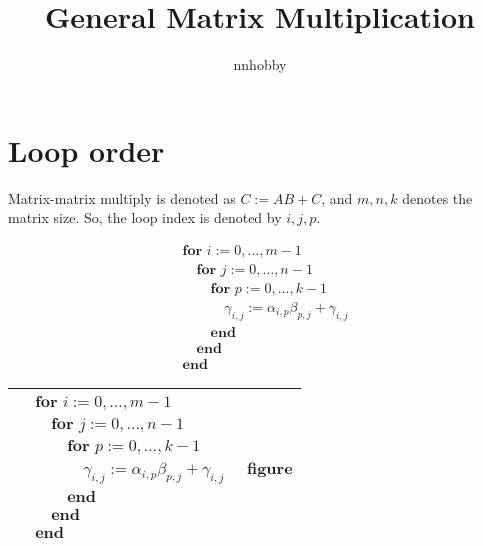 \documentclass[a4paper,12pt]{article}
\title{General Matrix Multiplication}
\author{nnhobby}
\date{}
\begin{document}
\maketitle

\section{Loop order}
Matrix-matrix multiply is denoted as $C := AB + C$, and $m, n, k$ denotes the matrix size.
So, the loop index is denoted by $i, j, p$.

\begin{align*}
&\textbf{for~} i := 0, \ldots , m-1 \\
&\hspace{1em} \textbf{for~} j := 0, \ldots , n-1 \\
&\hspace{2em} \textbf{for~} p := 0, \ldots , k-1 \\
&\hspace{3em} \gamma_{i,j} := \alpha_{i,p} \beta_{p,j} + \gamma_{i,j} \\
&\hspace{2em} \textbf{end} \\
&\hspace{1em} \textbf{end} \\
&\textbf{end}
\end{align*}


\begin{center}
\begin{tabular}{|l|c|}
\hline
{$\!\begin{aligned}
&\textbf{for~} i := 0, \ldots , m-1 \\
&\hspace{1em} \textbf{for~} j := 0, \ldots , n-1 \\
&\hspace{2em} \textbf{for~} p := 0, \ldots , k-1 \\
&\hspace{3em} \gamma_{i,j} := \alpha_{i,p} \beta_{p,j} + \gamma_{i,j} \\
&\hspace{2em} \textbf{end} \\
&\hspace{1em} \textbf{end} \\
&\textbf{end}
\end{aligned}$}
& figure \\
\hline
\end{tabular}
\end{center}
\end{document}
